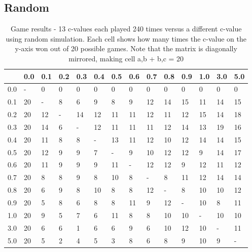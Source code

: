 \documentclass[11pt,a4paper]{article}
\begin{document}
\begin{appendices}
\subsection{Random}
\begin{table}[H]
	\centering
	\begin{tabular}{|l||l|l|l|l|l|l|l|l|l|l|l|l|l|}
		\hline
		& 0.0 & 0.1 & 0.2 & 0.3 & 0.4 & 0.5 & 0.6 & 0.7 & 0.8 & 0.9 & 1.0 & 3.0 & 5.0 \\ \hline
	    \hline
		0.0 & -   & 0   & 0   & 0   & 0   & 0   & 0   & 0   & 0   & 0   & 0   & 0   & 0   \\ \hline
		0.1 & 20  & -   & 8   & 6   & 9   & 8   & 9   & 12  & 14  & 15  & 11  & 14  & 15  \\ \hline
		0.2 & 20  & 12  & -   & 14  & 12  & 11  & 11  & 12  & 11  & 12  & 15  & 14  & 18  \\ \hline
		0.3 & 20  & 14  & 6   & -   & 12  & 11  & 11  & 11  & 12  & 14  & 13  & 19  & 16  \\ \hline
		0.4 & 20  & 11  & 8   & 8   & -   & 13  & 11  & 12  & 10  & 12  & 14  & 14  & 15  \\ \hline
		0.5 & 20  & 12  & 9   & 9   & 7   & -   & 9   & 10  & 12  & 12  & 9   & 14  & 17  \\ \hline
		0.6 & 20  & 11  & 9   & 9   & 9   & 11  & -   & 12  & 12  & 9   & 12  & 11  & 12  \\ \hline
		0.7 & 20  & 8   & 8   & 9   & 8   & 10  & 8   & -   & 8   & 11  & 12  & 14  & 14  \\ \hline
		0.8 & 20  & 6   & 9   & 8   & 10  & 8   & 8   & 12  & -   & 8   & 10  & 10  & 12  \\ \hline
		0.9 & 20  & 5   & 8   & 6   & 8   & 8   & 11  & 9   & 12  & -   & 10  & 8   & 11  \\ \hline
		1.0 & 20  & 9   & 5   & 7   & 6   & 11  & 8   & 8   & 10  & 10  & -   & 10  & 10  \\ \hline
		3.0 & 20  & 6   & 6   & 1   & 6   & 6   & 9   & 6   & 10  & 12  & 10  & -   & 11  \\ \hline
		5.0 & 20  & 5   & 2   & 4   & 5   & 3   & 8   & 6   & 8   & 9   & 10  & 9   & -   \\ \hline
	\end{tabular}
	\caption{Game results - 13 c-values each played 240 times versus a different c-value using random simulation. Each cell shows how many times the c-value on the y-axis won out of 20 possible games. Note that the matrix is diagonally mirrored, making cell a,b + b,c = 20}
	\label{table:ranking-matrix-random}
\end{table}


\end{appendices}
\end{document}
